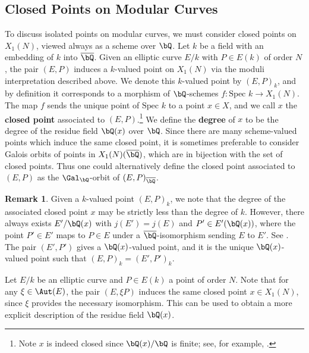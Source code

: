 \documentclass[11pt,reqno]{amsart}
\theoremstyle{plain}
\theoremstyle{definition}
\newtheorem{remark}[theorem]{Remark}
\newcommand{\Q}{\bQ}
\newcommand{\abbey}[1]{\textcolor{blue}{Abbey: #1}}
\begin{document}
\subsection{Closed Points on Modular Curves} To discuss isolated points on modular curves, we must consider closed points on $X_1(N)$, viewed always as a scheme over $\Q$. Let $k$ be a field with an embedding of $k$ into $\overline \Q$. Given an elliptic curve $E/k$ with $P \in E(k)$ of order $N$, the pair $(E,P)$ induces a $k$-valued point on $X_1(N)$ via the moduli interpretation described above. We denote this $k$-valued point by $(E,P)_k$, and by definition it corresponds to a morphism of $\Q$-schemes $f:\text{Spec } k \rightarrow X_1(N)$. The map $f$ sends the unique point of $\text{Spec } k$ to a point $x \in X$, and we call $x$ the \textbf{closed point} associated to $(E,P)$.\footnote{Note $x$ is indeed closed since $\Q(x)/\Q$ is finite; see, for example, \cite[Exercise~5.9, p.~76] {Liu2002}.} We define the \textbf{degree} of $x$ to be the degree of the residue field $\Q(x)$ over $\Q$. Since there are many scheme-valued points which induce the same closed point, it is sometimes preferable to consider Galois orbits of points in $X_1(N)(\overline{\Q})$, which are in bijection with the set of closed points. Thus one could alternatively define the closed point associated to $(E,P)$ as the $\Gal_\Q$-orbit of $(E,P)_{\overline{\Q}}$.

\begin{remark} Given a $k$-valued point $(E,P)_k$, we note that the degree of the associated closed point $x$ may be strictly less than the degree of $k$. However, there always exists $E'/\Q(x)$ with $j(E')=j(E)$ and $P' \in E'(\Q(x))$, where the point $P' \in E'$ maps to $P \in E$ under a $\overline \Q$-isomorphism sending $E$ to $E'$. See \cite[p.~274, Proposition~VI.3.2]{DR}. The pair $(E',P')$ gives a $\Q(x)$-valued point, and it is the unique $\Q(x)$-valued point such that $(E,P)_{k}=(E',P')_{k}.$
\end{remark}

Let $E/k$ be an elliptic curve and $P \in E(k)$ a point of order $N$. Note that for any $\xi \in \Aut(E)$, the pair $(E,\xi P)$ induces the same closed point $x \in X_1(N)$, since $\xi$ provides the necessary isomorphism. This can be used to obtain a more explicit description of the residue field $\Q(x)$.
\end{document}
